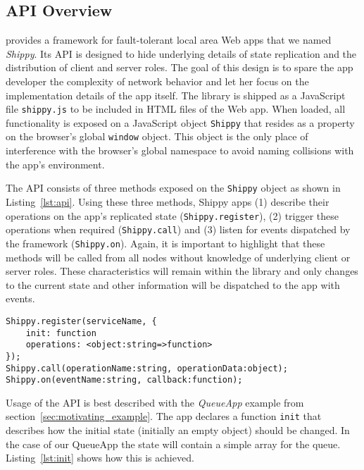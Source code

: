 \subsection{API Overview}
\label{sub:approach_api_overview}

\APIName provides a framework for fault-tolerant local area Web apps that we named \textit{Shippy}.
Its API is designed to hide underlying details of state replication and the distribution of client and server roles.
The goal of this design is to spare the app developer the complexity of network behavior and let her focus on the implementation details of the app itself.
The library is shipped as a JavaScript file \texttt{shippy.js} to be included in HTML files of the Web app.
When loaded, all functionality is exposed on a JavaScript object \texttt{Shippy} that resides as a property on the browser's global \texttt{window} object.
This object is the only place of interference with the browser's global namespace to avoid naming collisions with the app's environment.

The API consists of three methods exposed on the \texttt{Shippy} object as shown in Listing~\ref{lst:api}.
Using these three methods, Shippy apps (1) describe their operations on the app's replicated state (\texttt{Shippy.register}), (2) trigger these operations when required (\texttt{Shippy.call}) and (3) listen for events dispatched by the framework (\texttt{Shippy.on}).
Again, it is important to highlight that these methods will be called from all nodes without knowledge of underlying client or server roles.
These characteristics will remain within the library and only changes to the current state and other information will be dispatched to the app with events.

\begin{lstlisting}[caption={\APIName API},label={lst:api}]
Shippy.register(serviceName, {
    init: function
    operations: <object:string=>function>
});
Shippy.call(operationName:string, operationData:object);
Shippy.on(eventName:string, callback:function);
\end{lstlisting}

Usage of the API is best described with the \textit{QueueApp} example from section~\ref{sec:motivating_example}.
The app declares a function \texttt{init} that describes how the initial state (initially an empty object) should be changed.
In the case of our QueueApp the state will contain a simple array for the queue.
Listing~\ref{lst:init} shows how this is achieved.

